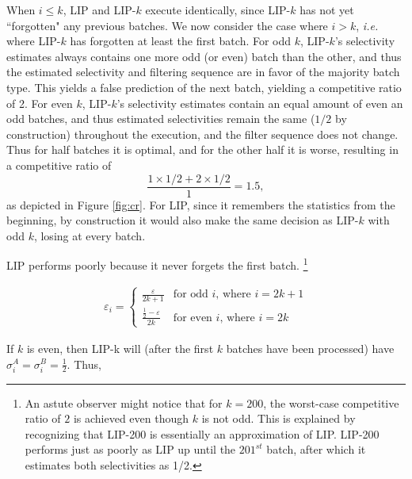 When $i \leq k$, LIP and LIP-$k$ execute identically, since LIP-$k$ has not yet ``forgotten" any previous batches. We now consider the case where $i > k$, {\it i.e.} where LIP-$k$ has forgotten at least the first batch. For odd $k$, LIP-$k$'s selectivity estimates always contains one more odd (or even) batch than the other, and thus the estimated selectivity and filtering sequence are in favor of the majority batch type. This yields a false prediction of the next batch, yielding a competitive ratio of 2. For even $k$, LIP-$k$'s selectivity estimates contain an equal amount of even an odd batches,  and thus estimated selectivities remain the same ($1/2$ by construction) throughout the execution, and the filter sequence does not change. Thus for half batches it is optimal, and for the other half it is worse, resulting in a competitive ratio of \[ \frac{1 \times 1/2 + 2 \times 1/2}{1} = 1.5,\] as depicted in Figure \ref{fig:cr}. For LIP, since it remembers the statistics from the beginning, by construction it would also make the same decision as LIP-$k$ with odd $k$, losing at every batch. 

LIP performs poorly because it never forgets the first batch.
\footnote{An astute observer might notice that for $k = 200$, the worst-case competitive ratio of $2$ is achieved even though $k$ is not odd. This is explained by recognizing that LIP-200 is essentially an approximation of LIP. LIP-200 performs just as poorly as LIP up until  the $201^{st}$ batch, after which it estimates both selectivities as 1/2.}



\begin{align*}
\varepsilon_i = 
    \begin{cases}
    \frac{\varepsilon}{2k+1} & \text{for odd $i$, where $i = 2k + 1$} \\ 
    \frac{\frac{1}{2} - \varepsilon}{2k} & \text{for even $i$, where $i = 2k$}
    \end{cases}
\end{align*}

If $k$ is even, then LIP-k will (after the first $k$ batches have been processed) have $\sigma^A_i = \sigma^B_i = \frac{1}{2}$. Thus,

